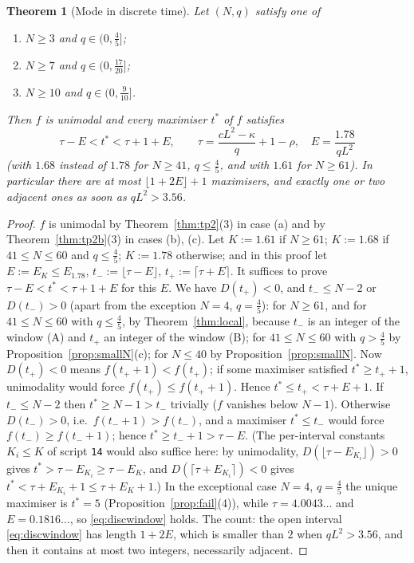 \documentclass[11pt,a4paper]{article}
\newtheorem{theorem}{Theorem}[section]
\theoremstyle{definition}
\theoremstyle{remark}
\begin{document}
\begin{theorem}[Mode in discrete time]\label{thm:discmode}
Let $(N,q)$ satisfy one of
\begin{enumerate}
\item[(a)] $N\ge3$ and $q\in(0,\frac45]$;
\item[(b)] $N\ge7$ and $q\in(0,\frac{17}{20}]$;
\item[(c)] $N\ge10$ and $q\in(0,\frac9{10}]$.
\end{enumerate}
Then $f$ is unimodal and every maximiser $t^*$ of $f$ satisfies
\begin{equation}\label{eq:discwindow}
   \tau-E<t^*<\tau+1+E,\qquad \tau=\frac{cL^2-\kappa}{q}+1-\rho,\quad E=\frac{1.78}{qL^2}
\end{equation}
(with $1.68$ instead of $1.78$ for $N\ge41$, $q\le\frac45$, and with $1.61$ for $N\ge61$). In particular there are at most
$\lfloor1+2E\rfloor+1$ maximisers, and exactly one or two adjacent ones as soon as $qL^2>3.56$.
\end{theorem}
\begin{proof}
$f$ is unimodal by Theorem~\ref{thm:tp2}(3) in case (a) and by Theorem~\ref{thm:tp2b}(3) in cases (b), (c). Let
$K:=1.61$ if $N\ge61$; $K:=1.68$ if $41\le N\le60$ and $q\le\frac45$; $K:=1.78$ otherwise; and in this proof let
$E:=E_K\le E_{1.78}$, $t_-:=\lfloor\tau-E\rfloor$, $t_+:=\lceil\tau+E\rceil$. It suffices to prove
$\tau-E<t^*<\tau+1+E$ for this $E$. We have $D(t_+)<0$, and $t_-\le N-2$ or $D(t_-)>0$ (apart
from the exception $N=4$, $q=\frac45$): for $N\ge61$, and for $41\le N\le60$ with $q\le\frac45$, by
Theorem~\ref{thm:local}, because $t_-$ is an integer of the window (A) and $t_+$ an integer of the window (B); for
$41\le N\le60$ with $q>\frac45$ by Proposition~\ref{prop:smallN}(c); for $N\le40$ by Proposition~\ref{prop:smallN}.
Now $D(t_+)<0$ means $f(t_++1)<f(t_+)$; if some maximiser satisfied $t^*\ge t_++1$, unimodality would force
$f(t_+)\le f(t_++1)$. Hence $t^*\le t_+<\tau+E+1$. If $t_-\le N-2$ then $t^*\ge N-1>t_-$ trivially ($f$ vanishes below
$N-1$). Otherwise $D(t_-)>0$, i.e.\ $f(t_-+1)>f(t_-)$, and a maximiser $t^*\le t_-$ would force $f(t_-)\ge f(t_-+1)$; hence
$t^*\ge t_-+1>\tau-E$. (The per-interval constants $K_i\le K$ of script \texttt{14} would also suffice here: by
unimodality, $D(\lfloor\tau-E_{K_i}\rfloor)>0$ gives $t^*>\tau-E_{K_i}\ge\tau-E_K$, and $D(\lceil\tau+E_{K_i}\rceil)<0$ gives
$t^*<\tau+E_{K_i}+1\le\tau+E_K+1$.) In the exceptional case $N=4$, $q=\frac45$ the unique maximiser is $t^*=5$
(Proposition~\ref{prop:fail}(4)), while $\tau=4.0043\ldots$ and $E=0.1816\ldots$, so \eqref{eq:discwindow} holds.
The count: the open interval \eqref{eq:discwindow} has length $1+2E$,
which is smaller than $2$ when $qL^2>3.56$, and then it contains at most two integers, necessarily adjacent.
\end{proof}
\end{document}
